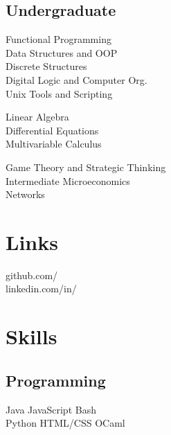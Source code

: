 \documentclass[]{deedy-resume-openfont}
\begin{document}
\begin{minipage}[t]{0.33\textwidth}
\subsection{Undergraduate}
Functional Programming \\
Data Structures and OOP \\
Discrete Structures \\
Digital Logic and Computer Org. \\
Unix Tools and Scripting \newline

Linear Algebra \\
Differential Equations\\
Multivariable Calculus\newline

Game Theory and Strategic Thinking\\
Intermediate Microeconomics\\
Networks \\
\sectionsep


\section{Links} 
github.com/\href{https://github.com/kuang}{} \\
linkedin.com/in/\href{https://www.linkedin.com/in/kuangjustin}{} \\
\sectionsep

\section{Skills}
\subsection{Programming}
Java \textbullet{}   JavaScript \textbullet{} Bash \\
Python \textbullet{} HTML/CSS \textbullet OCaml
\newline
\newline


\end{minipage}
\end{document}
